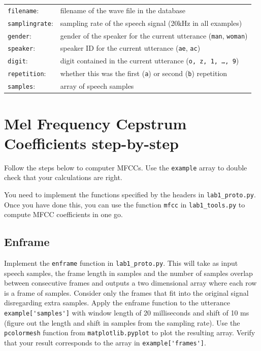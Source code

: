 \documentclass{nada-ten}
\begin{document}
\begin{tabular}{ll}
  \verb|filename|: & filename of the wave file in the database \\
  \verb|samplingrate|: & sampling rate of the speech signal (20kHz in all examples) \\
  \verb|gender|: & gender of the speaker for the current utterance (\texttt{man}, \texttt{woman}) \\
  \verb|speaker|: & speaker ID for the current utterance (\texttt{ae}, \texttt{ac})\\
  \verb|digit|: & digit contained in the current utterance (\texttt{o, z, 1, \dots, 9})\\
  \verb|repetition|: & whether this was the first (\texttt{a}) or second (\texttt{b}) repetition \\
  \verb|samples|: & array of speech samples
\end{tabular}

\section{Mel Frequency Cepstrum Coefficients step-by-step}
\label{sec:mfcc}
Follow the steps below to computer MFCCs. Use the \texttt{example} array to double check that your calculations are right.

You need to implement the functions specified by the headers in \texttt{lab1\_proto.py}. Once you have done this, you can use the function \texttt{mfcc} in \texttt{lab1\_tools.py} to compute MFCC coefficients in one go.

\subsection{Enframe}
Implement the \texttt{enframe} function in \texttt{lab1\_proto.py}. This will take as input speech samples, the frame length in samples and the number of samples overlap between consecutive frames and outputs a two dimensional array where each row is a frame of samples. Consider only the frames that fit into the original signal disregarding extra samples. Apply the enframe function to the utterance \verb|example['samples']| with window length of 20 milliseconds and shift of 10 ms (figure out the length and shift in samples from the sampling rate). Use the \texttt{pcolormesh} function from \texttt{matplotlib.pyplot} to plot the resulting array.
Verify that your result corresponds to the array in \verb|example['frames']|.
\end{document}
